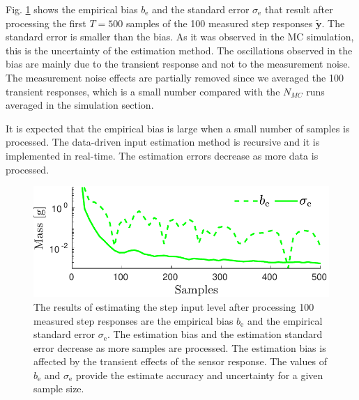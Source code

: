 Fig. \ref{fig:b_sigma_exp_str} shows the empirical bias $b_{\mathrm{e}}$ and the standard error $\sigma_{\mathrm{e}}$ that result after processing the first $T=500$ samples of the 100 measured step responses $\widetilde{\mathbf{y}}$.
The standard error is smaller than the bias.
As it was observed in the MC simulation, this is the uncertainty of the estimation method.
The oscillations observed in the bias are mainly due to the transient response and not to the measurement noise.
The measurement noise effects are partially removed since we averaged the 100 transient responses, 
which is a small number compared with the $N_{MC}$ runs averaged in the simulation section. 

It is expected that the empirical bias is large when a small number of samples is processed. 
The data-driven input estimation method is recursive and it is implemented in real-time.
The estimation errors decrease as more data is processed.

\begin{figure}[!htb]
\centering
\includegraphics[width=1.0\columnwidth]{./ChapterExperimentalValidation/fig/Fig_8.pdf} 
\caption{ \label{fig:b_sigma_exp_str} 
The results of estimating the step input level after processing 100 measured step responses are the empirical bias $b_{\mathrm{e}}$ and the empirical standard error $\sigma_{\mathrm{e}}$. 
The estimation bias and the estimation standard error decrease as more samples are processed. 
The estimation bias is affected by the transient effects of the sensor response.  
The values of $b_{\mathrm{e}}$ and $\sigma_{\mathrm{e}}$ provide the estimate accuracy and uncertainty for a given sample size.
}
\end{figure}

